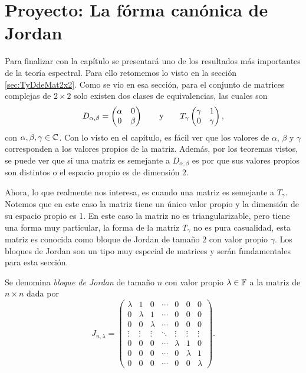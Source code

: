 \section{Proyecto: La fórma canónica de Jordan}

Para finalizar con la capítulo se presentará uno de los resultados más importantes de la teoría espectral. Para ello retomemos lo visto en la sección \ref{sec:TyDdeMat2x2}. Como se vio en esa sección, para el conjunto de matrices complejas de $2\times 2$ solo existen dos clases de equivalencias, las cuales son
\[
  D_{\alpha, \beta} = \begin{pmatrix}
    \alpha & 0 \\ 0 & \beta
  \end{pmatrix}
    \qquad\text{y}\qquad
  T_\gamma \begin{pmatrix}
      \gamma & 1 \\ 0 & \gamma
    \end{pmatrix},
\]
con $\alpha, \beta, \gamma \in \mathbb{C}$. Con lo visto en el capítulo, es fácil ver que los valores de $\alpha$, $\beta$ y $\gamma$ corresponden a los valores propios de la matriz. Además, por los teoremas vistos, se puede ver que si una matriz es semejante a $D_{\alpha, \beta}$ es por que sus valores propios son distintos o el espacio propio es de dimensión $2$.

Ahora, lo que realmente nos interesa, es cuando una matriz es semejante a $T_\gamma$. Notemos que en este caso la matriz tiene un único valor propio y la dimensión de su espacio propio es 1. En este caso la matriz no es triangularizable, pero tiene una forma muy particular, la forma de la matriz $T_\gamma$ no es pura casualidad, esta matriz es conocida como bloque de Jordan de tamaño 2 con valor propio $\gamma$. Los bloques de Jordan son un tipo muy especial de matrices y serán fundamentales para esta sección.

\begin{defi}
  Se denomina \emph{bloque de Jordan} de tamaño $n$ con valor propio $\lambda \in \mathbb{F}$ a la matriz de $n\times n$ dada por
    \[
      J_{n,\lambda} = \begin{pmatrix}
        \lambda & 1       & 0       & \cdots & 0       & 0       & 0       \\
        0       & \lambda & 1       & \cdots & 0       & 0       & 0       \\
        0       & 0       & \lambda & \cdots & 0       & 0       & 0       \\
        \vdots  & \vdots  & \vdots  & \ddots & \vdots  & \vdots  & \vdots  \\
        0       & 0       & 0       & \cdots & \lambda & 1       & 0       \\
        0       & 0       & 0       & \cdots & 0       & \lambda & 1       \\
        0       & 0       & 0       & \cdots & 0       & 0       & \lambda
      \end{pmatrix}.
    \]
\end{defi}

